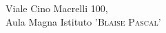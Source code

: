 \documentclass[preview]{standalone}
\begin{document}
\begin{center}
Viale Cino Macrelli 100,\\Aula Magna Istituto '\textsc{Blaise Pascal}'
\end{center}
\end{document}

